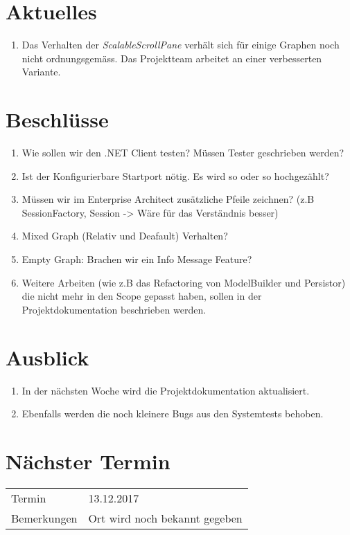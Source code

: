 \documentclass[11pt, a4paper,oneside]{scrartcl}
\begin{document}
	\section{Aktuelles}
		\begin{enumerate}
		\item Das Verhalten der \textit{ScalableScrollPane} verhält sich für einige Graphen noch nicht ordnungsgemäss. Das Projektteam arbeitet an einer verbesserten Variante.
	\end{enumerate} 
	
	\section{Beschlüsse}
	\begin{enumerate}
		\item Wie sollen wir den .NET Client testen? Müssen Tester geschrieben werden?
		\item Ist der Konfigurierbare Startport nötig. Es wird so oder so hochgezählt?
		\item Müssen wir im Enterprise Architect zusätzliche Pfeile zeichnen? (z.B SessionFactory, Session -> Wäre für das Verständnis besser)
		\item Mixed Graph (Relativ und Deafault) Verhalten?
		\item Empty Graph: Brachen wir ein Info 	Message Feature?
		\item Weitere Arbeiten (wie z.B das Refactoring von ModelBuilder und Persistor) die nicht mehr in den Scope gepasst haben, sollen in der Projektdokumentation beschrieben werden.
	\end{enumerate}

	\section{Ausblick}
	\begin{enumerate}
		\item In der nächsten Woche wird die Projektdokumentation aktualisiert. 
		\item Ebenfalls werden die noch kleinere Bugs aus den Systemtests behoben.
	\end{enumerate}
	
	\section{Nächster Termin}
	\begin{tabu} to \linewidth {l X }
		\toprule
		Termin & 13.12.2017  \\
		Bemerkungen & Ort wird noch bekannt gegeben  \\
		\bottomrule
	\end{tabu}
	
\end{document}
